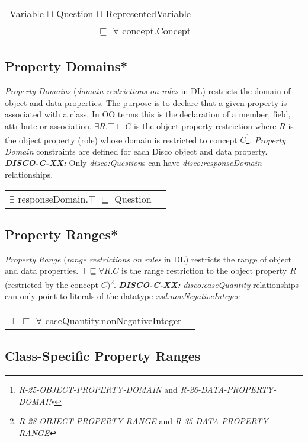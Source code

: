 \documentclass{llncs}
\newenvironment{DL}{
  \vspace{0cm}
  \begin{tabular}{r l}

}{
  \end{tabular}
}
\begin{document}
\begin{DL}
Variable $\sqcup$ Question $\sqcup$ RepresentedVariable \\
$\sqsubseteq$ $\forall$ concept.Concept \\
\end{DL}
		
\subsection{Property Domains*}

{\em Property Domains} ({\em domain restrictions on roles} in DL) restricts the domain of object and data properties.
The purpose is to declare that a given property is associated with a class. 
In OO terms this is the declaration of a member, field, attribute or association. 
$\exists R. \top \sqsubseteq C$ is the object property restriction where $R$ is the object property (role) whose domain is restricted to concept $C$\footnote{{\em R-25-OBJECT-PROPERTY-DOMAIN} and {\em R-26-DATA-PROPERTY-DOMAIN}}.
{\em Property Domain} constraints are defined for each Disco object and data property.
\textbf{{\em DISCO-C-XX:}} 
Only {\em disco:Question}s can have {\em disco:responseDomain} relationships.

\begin{DL}
$\exists$ responseDomain.$\top$ $\sqsubseteq$ Question 
\end{DL}

\subsection{Property Ranges*}

{\em Property Range} ({\em range restrictions on roles} in DL) restricts the range of object and data properties.
$\top \sqsubseteq \forall R . C$ is the range restriction to the object property $R$ (restricted by the concept $C$)\footnote{{\em R-28-OBJECT-PROPERTY-RANGE} and {\em R-35-DATA-PROPERTY-RANGE}}. 
\textbf{{\em DISCO-C-XX:}} 
{\em disco:caseQuantity} relationships can only point to literals of the datatype {\em xsd:nonNegativeInteger}.

\begin{DL}
$\top$ $\sqsubseteq$ $\forall$ caseQuantity.nonNegativeInteger \\
\end{DL}

\subsection{Class-Specific Property Ranges}		
\end{document}
